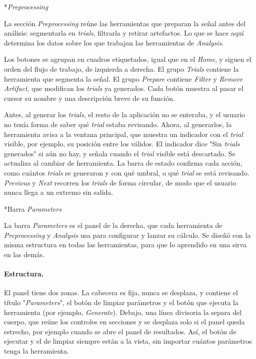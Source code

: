 \documentclass[12pt,letterpaper,oneside]{article}
\makeatletter
\newcommand{\subsubsubsection}[1]{%
  \@startsection{paragraph}{4}{\z@}{10pt plus 2pt minus 1pt}{4pt}%
    {\normalfont\normalsize\bfseries\itshape}*{#1}}
\makeatother
\begin{document}
\subsubsubsection{\textit{Preprocessing}}

La sección \textit{Preprocessing} reúne las herramientas que preparan la señal antes del análisis: segmentarla en \textit{trials}, filtrarla y retirar artefactos. Lo que se hace aquí determina los datos sobre los que trabajan las herramientas de \textit{Analysis}.

Los botones se agrupan en cuadros etiquetados, igual que en el \textit{Home}, y siguen el orden del flujo de trabajo, de izquierda a derecha. El grupo \textit{Trials} contiene la herramienta que segmenta la señal. El grupo \textit{Prepare} contiene \textit{Filter} y \textit{Remove Artifact}, que modifican los \textit{trials} ya generados. Cada botón muestra al pasar el cursor su nombre y una descripción breve de su función.

Antes, al generar los \textit{trials}, el resto de la aplicación no se enteraba, y el usuario no tenía forma de saber qué \textit{trial} estaba revisando. Ahora, al generarlos, la herramienta avisa a la ventana principal, que muestra un indicador con el \textit{trial} visible, por ejemplo, su posición entre los válidos. El indicador dice "Sin \textit{trials} generados" si aún no hay, y señala cuando el \textit{trial} visible está descartado. Se actualiza al cambiar de herramienta. La barra de estado confirma cada acción, como cuántos \textit{trials} se generaron y con qué umbral, o qué \textit{trial} se está revisando. \textit{Previous} y \textit{Next} recorren los \textit{trials} de forma circular, de modo que el usuario nunca llega a un extremo sin salida.

\subsubsubsection{Barra \textit{Parameters}}

La barra \textit{Parameters} es el panel de la derecha, que cada herramienta de \textit{Preprocessing} y \textit{Analysis} usa para configurar y lanzar su cálculo. Se diseñó con la misma estructura en todas las herramientas, para que lo aprendido en una sirva en las demás.

\paragraph{Estructura.} El panel tiene dos zonas. La cabecera es fija, nunca se desplaza, y contiene el título "\textit{Parameters}", el botón de limpiar parámetros y el botón que ejecuta la herramienta (por ejemplo, \textit{Generate}). Debajo, una línea divisoria la separa del cuerpo, que reúne los controles en secciones y se desplaza solo si el panel queda estrecho, por ejemplo cuando se abre el panel de resultados. Así, el botón de ejecutar y el de limpiar siempre están a la vista, sin importar cuántos parámetros tenga la herramienta.
\end{document}
